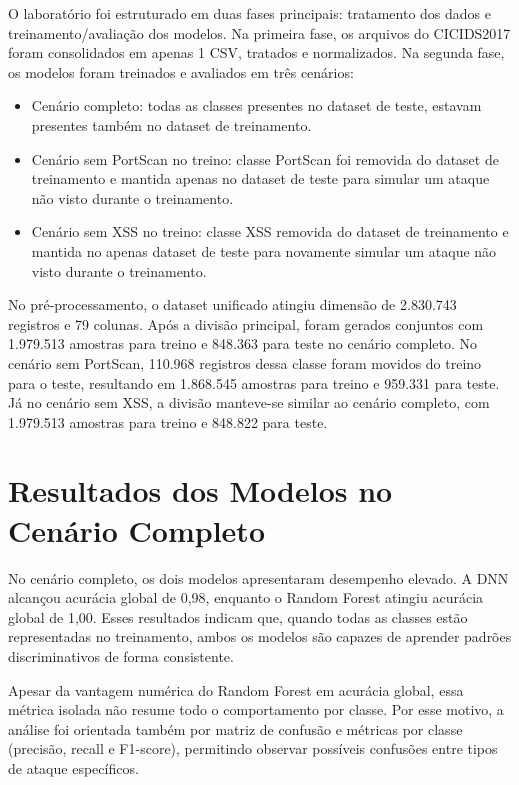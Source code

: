 \documentclass[12pt,oneside]{abntex2}
\begin{document}
O laboratório foi estruturado em duas fases principais: tratamento dos dados e treinamento/avaliação dos modelos. Na primeira fase, os arquivos do CICIDS2017 foram consolidados em apenas 1 CSV, tratados e normalizados. Na segunda fase, os modelos foram treinados e avaliados em três cenários:

\begin{itemize}
\item Cenário completo: todas as classes presentes no dataset de teste, estavam presentes também no dataset de treinamento.
\item Cenário sem PortScan no treino: classe PortScan foi removida do dataset de treinamento e mantida apenas no dataset de teste para simular um ataque não visto durante o treinamento.
\item Cenário sem XSS no treino: classe XSS removida do dataset de treinamento e mantida no apenas dataset de teste para novamente simular um ataque não visto durante o treinamento.
\end{itemize}

No pré-processamento, o dataset unificado atingiu dimensão de 2.830.743 registros e 79 colunas. Após a divisão principal, foram gerados conjuntos com 1.979.513 amostras para treino e 848.363 para teste no cenário completo. No cenário sem PortScan, 110.968 registros dessa classe foram movidos do treino para o teste, resultando em 1.868.545 amostras para treino e 959.331 para teste. Já no cenário sem XSS, a divisão manteve-se similar ao cenário completo, com 1.979.513 amostras para treino e 848.822 para teste.

\section{Resultados dos Modelos no Cenário Completo}

No cenário completo, os dois modelos apresentaram desempenho elevado. A DNN alcançou acurácia global de 0,98, enquanto o Random Forest atingiu acurácia global de 1,00. Esses resultados indicam que, quando todas as classes estão representadas no treinamento, ambos os modelos são capazes de aprender padrões discriminativos de forma consistente.

Apesar da vantagem numérica do Random Forest em acurácia global, essa métrica isolada não resume todo o comportamento por classe. Por esse motivo, a análise foi orientada também por matriz de confusão e métricas por classe (precisão, recall e F1-score), permitindo observar possíveis confusões entre tipos de ataque específicos.
\end{document}

